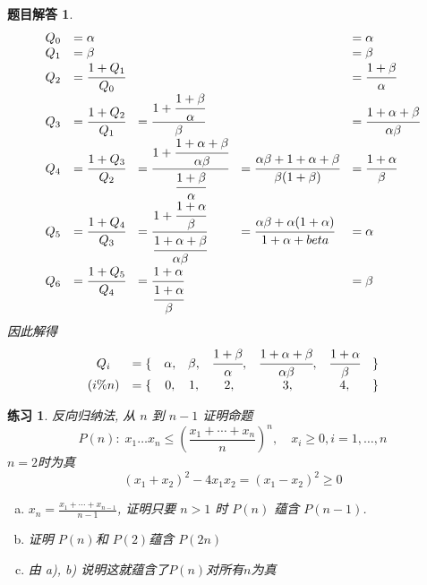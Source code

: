 \documentclass[mode=geye, chinesefont=founder]{elegantnote}
\newtheorem{exercise}{练习}
\newtheorem{answer}{题目解答}
\begin{document}
\begin{answer}
	\begin{equation*}
		\begin{array}{lllll}
			Q_0 &= \alpha & & &= \alpha\\
			Q_1 &= \beta  & & &= \beta\\
			Q_2 &= \cfrac{1+Q_1}{Q_0} & &&= \cfrac{1+\beta}{\alpha} \\
			Q_3 &= \cfrac{1+Q_2}{Q_1} &= \cfrac{1+\cfrac{1+\beta}{\alpha}}{\beta} 
			&&= \cfrac{1+\alpha+\beta}{\alpha\beta} \\
			Q_4 &= \cfrac{1+Q_3}{Q_2} 
			&= \cfrac{1+\cfrac{1+\alpha+\beta}{\alpha\beta} }{\cfrac{1+\beta}{\alpha}}
			&= \cfrac{\alpha\beta+1+\alpha+\beta}{\beta(1+\beta)} 
			&= \cfrac{1+\alpha}{\beta} \\
			Q_5 &= \cfrac{1+Q_4}{Q_3} 
			&= \cfrac{1+\cfrac{1+\alpha}{\beta}}{ \cfrac{1+\alpha+\beta}{\alpha\beta}}
			&= \cfrac{\alpha\beta+\alpha(1+\alpha)}{1+\alpha+beta} &= \alpha \\
			Q_6 &= \cfrac{1+Q_5}{Q_4} &= \cfrac{1+\alpha}{\cfrac{1+\alpha}{\beta}} & &= \beta\\
		\end{array}
	\end{equation*}
	因此解得 
	\begin{equation*}
		\begin{array}{clcccccc}
			Q_i &= \{ &\alpha ,& \beta ,& \cfrac{1+\beta}{\alpha} ,& \cfrac{1+\alpha+\beta}{\alpha\beta} ,& \cfrac{1+\alpha}{\beta} & \}\\
			(i\%n) &= \{ & 0 ,& 1 ,& 2 ,& 3 ,& 4 ,& \}\\
		\end{array}
	\end{equation*}
\end{answer}	

\begin{exercise}
		反向归纳法, 从 $ n $ 到 $  n-1 $ 证明命题
	\begin{equation*}
		P(n) : \; x_{1} \dots x_{n} \leqslant \left( \frac{x_{1}+\cdots+x_{n}}{n}\right) ^n, \quad x_i \geqslant 0, i=1,\dots,n
	\end{equation*}
	$ n=2 $时为真 
	\begin{equation*}
		(x_{1}+x_{2})^2-4x_{1}x_{2} = (x_{1}-x_{2})^2 \geqslant 0
	\end{equation*}
	\begin{enumerate}[a)]
		\item $ x_n = \frac{x_{1}+\cdots+x_{n-1}}{n-1} $, 证明只要 $ n>1 $ 时 $ P(n) $ 蕴含 $ P(n-1) $.
		\item 证明 $ P(n) $和 $ P(2) $蕴含 $ P(2n) $
		\item 由 a), b) 说明这就蕴含了$ P(n) $对所有$ n $为真
	\end{enumerate}
\end{exercise}
\end{document}
